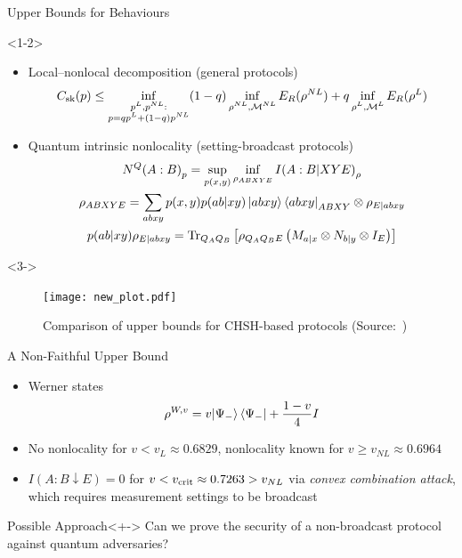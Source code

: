\documentclass[xcolor=dvipsnames]{beamer}
\newcommand{\?}{\mathrel{?}} %
\newcommand{\Tr}{\mathrm{Tr}} %
\newcommand{\sM}{\mathcal{M}}
\newcommand{\cP}{\mathcal{P}}
\newcommand{\sk}{\rm sk}
\newcommand{\crit}{\rm crit}
\begin{document}
\begin{frame}{Upper Bounds for Behaviours}
  \begin{onlyenv}<1-2>
    \begin{itemize}[<+->]
      \item Local--nonlocal decomposition (general protocols)
        \[ C_{\sk}(p) \leq \inf_{\substack{p^{L}, p^{NL} : \\ p = qp^{L} + (1-q)p^{NL}}} (1-q) \inf_{\substack{\rho^{NL}, \sM^{NL}}} E_R(\rho^{NL}) + q \inf_{\substack{\rho^{L}, \sM^{L}}} E_R(\rho^L) \]
      \item Quantum intrinsic nonlocality (setting-broadcast protocols)
        \begin{gather*}
          N^Q{(A:B)}_p = \sup_{p(x,y)} \inf_{\rho_{ABXYE}} I{(A:B|XYE)}_{\rho} \\
          \rho_{ABXYE} = \sum_{abxy} p(x,y) p(ab|xy) \ket{abxy}\bra{abxy}_{ABXY} \otimes \rho_{E|abxy} \\
          p(ab|xy) \rho_{E|abxy} = \Tr_{Q_A Q_B}\left[\rho_{Q_A Q_B E} \left(M_{a|x} \otimes N_{b|y} \otimes I_{E}\right) \right]
        \end{gather*}
    \end{itemize}
  \end{onlyenv}
  \begin{onlyenv}<3->
      \begin{figure}
        \centering
        \texttt{[image: new\_plot.pdf]}
        \caption{Comparison of upper bounds for CHSH-based protocols (Source:~\cite{CCSquashedEntangle})}
      \end{figure}
  \end{onlyenv}
\end{frame}


\begin{frame}{A Non-Faithful Upper Bound}
  \begin{itemize}[<+->]
    \item Werner states
      \[ \rho^{W,v} = v{\ket{\Psi_-}\bra{\Psi_-}} + \frac{1-v}{4}I \]
    \item No nonlocality for \(v < v_L \approx 0.6829\), nonlocality known for \(v \geq v_{NL} \approx 0.6964\)
    \item \(I(A:B \downarrow E) = 0\) for \(v < v_{\crit} \approx 0.7263 > v_{NL}\) via \emph{convex combination attack}, which requires measurement settings to be broadcast
  \end{itemize}

  \begin{block}{Possible Approach}<+->
    Can we prove the security of a non-broadcast protocol against quantum adversaries?
  \end{block}
\end{frame}
\end{document}
